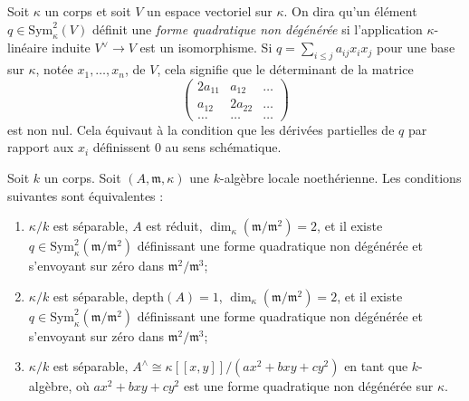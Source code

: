 \noindent
Soit $\kappa$ un corps et soit $V$ un espace vectoriel sur $\kappa$. On dira qu'un élément $q \in \text{Sym}^2_\kappa(V)$ définit une {\it forme quadratique non dégénérée} si l'application $\kappa$-linéaire induite $V^\vee \to V$ est un isomorphisme. Si $q = \sum_{i \leq j} a_{ij} x_i x_j$ pour une base sur $\kappa$, notée $x_1, \ldots, x_n$, de $V$, cela signifie que le déterminant de la matrice $$
\left(
\begin{matrix}
2a_{11} & a_{12} & \ldots \\
a_{12} & 2a_{22} & \ldots \\
\ldots & \ldots & \ldots
\end{matrix}
\right)
$$ est non nul. Cela équivaut à la condition que les dérivées partielles de $q$ par rapport aux $x_i$ définissent $0$ au sens schématique.

\begin{lemma}
\label{lemma-nodal-algebraic}
Soit $k$ un corps. Soit $(A, \mathfrak m, \kappa)$ une $k$-algèbre locale noethérienne. Les conditions suivantes sont équivalentes : \begin{enumerate} \item $\kappa/k$ est séparable, $A$ est réduit, $\dim_\kappa(\mathfrak m/\mathfrak m^2) = 2$, et il existe $q \in \text{Sym}^2_\kappa(\mathfrak m/\mathfrak m^2)$ définissant une forme quadratique non dégénérée et s'envoyant sur zéro dans $\mathfrak m^2/\mathfrak m^3$; \item $\kappa/k$ est séparable, $\text{depth}(A) = 1$, $\dim_\kappa(\mathfrak m/\mathfrak m^2) = 2$, et il existe $q \in \text{Sym}^2_\kappa(\mathfrak m/\mathfrak m^2)$ définissant une forme quadratique non dégénérée et s'envoyant sur zéro dans $\mathfrak m^2/\mathfrak m^3$; \item $\kappa/k$ est séparable, $A^\wedge \cong \kappa[[x, y]]/(ax^2 + bxy + cy^2)$ en tant que $k$-algèbre, où $ax^2 + bxy + cy^2$ est une forme quadratique non dégénérée sur $\kappa$.
\end{enumerate}
\end{lemma}

